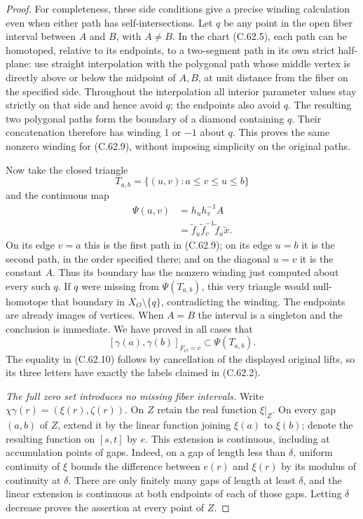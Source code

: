 \begin{proof}
For completeness, these side conditions give a precise
winding calculation even when either path has
self-intersections. Let $q$ be any point in the open
fiber interval between $A$ and $B$, with $A\ne B$.
In the chart (C.62.5), each path can be homotoped,
relative to its endpoints, to a two-segment path in
its own strict half-plane: use straight interpolation
with the polygonal path whose middle vertex is
directly above or below the midpoint of $A,B$,
at unit distance from the fiber on the specified
side. Throughout the interpolation
all interior parameter values stay strictly on that
side and hence avoid $q$; the endpoints also avoid
$q$. The resulting two polygonal paths form the
boundary of a diamond containing $q$. Their
concatenation therefore has winding $1$ or $-1$
about $q$. This proves the same nonzero winding for
(C.62.9), without imposing simplicity on the original
paths.

Now take the closed triangle
\[
 T_{a,b}=\{(u,v):a\leq v\leq u\leq b\}
\]
and the continuous map
\[
 \begin{split}
 \Psi(u,v)&=h_u h_v^{-1}A\\
          &=\widetilde f_u\widetilde f_v^{-1}
                                      \widetilde f_a\widetilde x.
 \end{split}                                                   \tag{C.62.10}
\]
On its edge $v=a$ this is the first path in (C.62.9);
on its edge $u=b$ it is the second path, in the order
specified there; and on the diagonal $u=v$ it is
the constant $A$. Thus its boundary has the nonzero
winding just computed about every such $q$.
If $q$ were missing from $\Psi(T_{a,b})$, this very
triangle would null-homotope that boundary in
$X_O\setminus\{q\}$, contradicting the winding.
The endpoints are already images of vertices.
When $A=B$ the interval is a singleton and the
conclusion is immediate. We have proved in all
cases that
\[
 [\gamma(a),\gamma(b)]_{F_O=c}
       \subset \Psi(T_{a,b}).
                                                               \tag{C.62.11}
\]
The equality in (C.62.10) follows by cancellation
of the displayed original lifts, so its three
letters have exactly the labels claimed in
(C.62.2).

\emph{The full zero set introduces no missing fiber intervals.}
Write $\chi\gamma(r)=(\xi(r),\zeta(r))$.
On $Z$ retain the real function $\xi|_Z$.
On every gap $(a,b)$ of $Z$, extend it by the
linear function joining $\xi(a)$ to $\xi(b)$;
denote the resulting function on $[s,t]$ by $e$.
This extension is continuous, including at
accumulation points of gaps. Indeed, on a gap of
length less than $\delta$, uniform continuity of
$\xi$ bounds the difference between $e(r)$ and
$\xi(r)$ by its modulus of continuity at
$\delta$. There are only finitely many gaps of
length at least $\delta$, and the linear extension
is continuous at both endpoints of each of
those gaps. Letting $\delta$ decrease proves the
assertion at every point of $Z$.


\end{proof}
